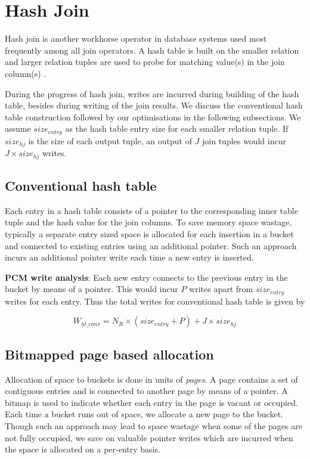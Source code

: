 \section{Hash Join}
\label{hj}

Hash join is another workhorse operator in database systems used most frequently among all join operators. A hash table is built on the smaller relation and larger relation tuples are used to probe for matching value(s) in the join column(s)    .

During the progress of hash join, writes are incurred during building of the hash table, besides during writing of the join results. We discuss the conventional hash table construction followed by our optimisations in the following subsections. We assume $size_{entry}$ as the hash table entry size for each smaller relation tuple. If $size_{hj}$ is the size of each output tuple, an output of $J$ join tuples would incur $J \times size_{hj}$ writes.

\subsection{Conventional hash table}
Each entry in a hash table consists of a pointer to the corresponding inner table tuple and the hash value for the join columns. To save memory space wastage, typically a separate entry sized space is allocated for each insertion in a bucket and connected to existing entries using an additional pointer. Such an approach incurs an additional pointer write each time a new entry is inserted.

\textbf{PCM write analysis}: Each new entry connects to the previous entry in the bucket by means of a pointer. This would incur $P$ writes apart from $size_{entry}$ writes for each entry. Thus the total writes for conventional hash table is given by

\begin{equation}\label{eq:ht_conv}
  W_{ht\_conv} = N_R \times (size_{entry} + P) + J \times size_{hj}
\end{equation}

\subsection{Bitmapped page based allocation}
Allocation of space to buckets is done in units of \textit{pages}. A page contains a set of contiguous entries and is connected to another page by means of a pointer. A bitmap is used to indicate whether each entry in the page is vacant or occupied. Each time a bucket runs out of space, we allocate a new page to the bucket. Though such an approach  may lead to space wastage when some of the pages are not fully occupied, we save on valuable pointer writes which are incurred when the space is allocated on a per-entry basis.

